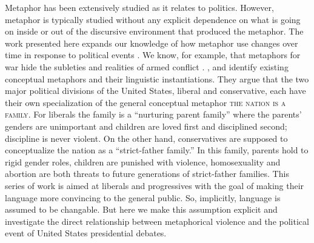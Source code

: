 Metaphor has been extensively studied as it relates to politics. 
However, metaphor is typically studied without any explicit
dependence on what is going on inside or out of the discursive environment
that produced the metaphor.  
The work presented here expands our knowledge of
how metaphor use changes over time in response to political events \cite{Gibbs1997}. 
We know, for example, that metaphors for war hide the subleties and realities of armed
conflict \cite{Lakoff1991}. , and  
identify existing conceptual metaphors and their linguistic instantiations. They
argue that the two major political divisions
of the United States, liberal and conservative, each have their own 
specialization of
the general conceptual metaphor \textsc{the nation is a family}. For liberals
the family is a ``nurturing parent family'' where the parents' genders are
unimportant and children are loved first and disciplined second; discipline is
never violent. On the other hand, conservatives are supposed to conceptualize
the nation as a ``strict-father family.'' In this family, parents hold to 
rigid gender roles, children are punished with violence, homosexuality and
abortion are both threats to future generations of strict-father families.
This series of work is aimed at liberals and progressives with the goal of 
making their language more convincing to the general public. So, implicitly, 
language is assumed to be changable. But here we make this assumption explicit
and investigate the direct relationship between metaphorical violence and 
the political event of United States presidential debates.


